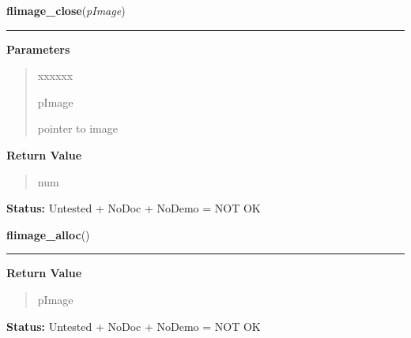 \hspace{.8\funcindent}\begin{boxedminipage}{\funcwidth}

    \raggedright \textbf{flimage\_close}(\textit{pImage})

    \vspace{-1.5ex}

    \rule{\textwidth}{0.5\fboxrule}
\setlength{\parskip}{2ex}
\setlength{\parskip}{1ex}
      \textbf{Parameters}
      \vspace{-1ex}

      \begin{quote}
        \begin{Ventry}{xxxxxx}

          \item[pImage]

          pointer to image

        \end{Ventry}

      \end{quote}

      \textbf{Return Value}
    \vspace{-1ex}

      \begin{quote}
      num

      \end{quote}

\textbf{Status:} Untested + NoDoc + NoDemo = NOT OK



    \end{boxedminipage}

    \label{xformslib:library:flimage_alloc}

    \vspace{0.5ex}

\hspace{.8\funcindent}\begin{boxedminipage}{\funcwidth}

    \raggedright \textbf{flimage\_alloc}()

    \vspace{-1.5ex}

    \rule{\textwidth}{0.5\fboxrule}
\setlength{\parskip}{2ex}
\setlength{\parskip}{1ex}
      \textbf{Return Value}
    \vspace{-1ex}

      \begin{quote}
      pImage

      \end{quote}

\textbf{Status:} Untested + NoDoc + NoDemo = NOT OK



    \end{boxedminipage}

